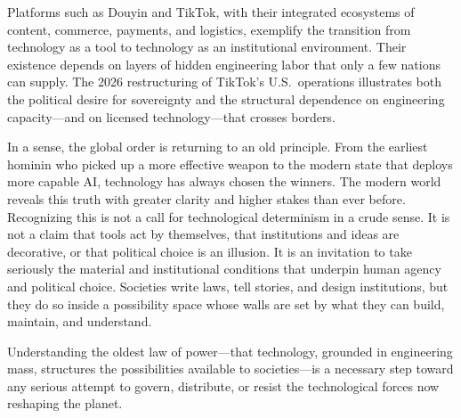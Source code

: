 \documentclass[12pt,letterpaper]{article}
\begin{document}
Platforms such as Douyin and TikTok, with their integrated ecosystems of content, commerce, payments, and logistics, exemplify the transition from technology as a tool to technology as an institutional environment. Their existence depends on layers of hidden engineering labor that only a few nations can supply. The 2026 restructuring of TikTok's U.S.\ operations illustrates both the political desire for sovereignty and the structural dependence on engineering capacity---and on licensed technology---that crosses borders.

In a sense, the global order is returning to an old principle. From the earliest hominin who picked up a more effective weapon to the modern state that deploys more capable AI, technology has always chosen the winners. The modern world reveals this truth with greater clarity and higher stakes than ever before. Recognizing this is not a call for technological determinism in a crude sense. It is not a claim that tools act by themselves, that institutions and ideas are decorative, or that political choice is an illusion. It is an invitation to take seriously the material and institutional conditions that underpin human agency and political choice. Societies write laws, tell stories, and design institutions, but they do so inside a possibility space whose walls are set by what they can build, maintain, and understand.

Understanding the oldest law of power---that technology, grounded in engineering mass, structures the possibilities available to societies---is a necessary step toward any serious attempt to govern, distribute, or resist the technological forces now reshaping the planet.

\clearpage
\printbibliography
\end{document}
